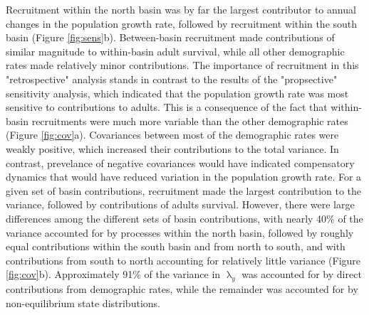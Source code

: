 Recruitment within the north basin was by far the largest contributor 
to annual changes in the population growth rate, 
followed by recruitment within the south basin (Figure \ref{fig:sens}b).
Between-basin recruitment made contributions of similar magnitude 
to within-basin adult survival, 
while all other demographic rates made relatively minor contributions.
The importance of recruitment in this "retrospective" analysis stands in contrast 
to the results of the "propsective" sensitivity analysis, 
which indicated that the population growth rate was most sensitive 
to contributions to adults.
This is a consequence of the fact that within-basin recruitments were much more variable
than the other demographic rates (Figure \ref{fig:cov}a).
Covariances between most of the demographic rates were weakly positive,
which increased their contributions to the total variance.
In contrast, prevelance of negative covariances would have indicated compensatory dynamics
that would have reduced variation in the population growth rate.
For a given set of basin contributions, 
recruitment made the largest contribution to the variance,
followed by contributions of adults survival.
However, there were large differences among the different sets of basin contributions,
with nearly 40\% of the variance accounted for by processes within the north basin,
followed by roughly equal contributions within the south basin and from north to south,
and with contributions from south to north accounting for relatively little variance
(Figure \ref{fig:cov}b).
Approximately 91\% of the variance in $\uplambda_y$ was accounted for by 
direct contributions from demographic rates, 
while the remainder was accounted for by non-equilibrium state distributions.



